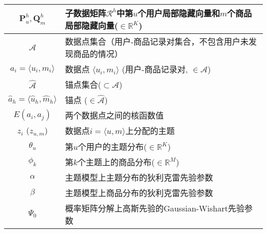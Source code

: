 \begin{table}[htbp]
\begin{tabular}{cp{}}
		$ \mathbf{P}^h_u, \mathbf{Q}^h_m$  & 子数据矩阵$\mathcal{R}^h$中第$u$个用户局部隐藏向量和$m$个商品局部隐藏向量($\in \mathbb{R}^K$)  \bigstrut\\
		\hline
		$\mathcal{A}$ & 数据点集合（用户-商品记录对集合，不包含用户未发现商品的情况） \bigstrut\\
		$a_i=\langle u_i, m_i \rangle$     & 数据点 $\langle u_i, m_i\rangle$ (用户-商品记录对, $\in \mathcal{A}$)   \bigstrut\\
		$ \mathcal{\hat{A}}$ & 锚点集合($\subset \mathcal{A}$) \bigstrut\\
		$\hat{a}_h=\langle\hat{u}_h, \hat{m}_h\rangle$ & 锚点  ($\in \mathcal{\hat{A}}$)   \bigstrut\\
		$E(a_i, a_j)$ & 两个数据点之间的核函数值 \bigstrut\\
		$z_i$ ($z_{u,m}$)   &数据点$i=\langle u,m\rangle$上分配的主题\bigstrut \\
		\hline
		$\theta_u$ & 第$u$个用户的主题分布($\in \mathbb{R}^K$) \bigstrut\\
		$\phi_k$ & 第$k$个主题上的商品分布($\in \mathbb{R}^M$) \bigstrut\\
		$\alpha$ &主题模型上主题分布的狄利克雷先验参数\bigstrut \\
		$\beta$ &  主题模型上商品分布的狄利克雷先验参数\bigstrut\\
		$\Psi_0$ & 概率矩阵分解上高斯先验的Gaussian-Wishart先验参数 \bigstrut\\
		\hline
	\end{tabular}
\end{table}

\clearpage
\phantom{s}
\clearpage